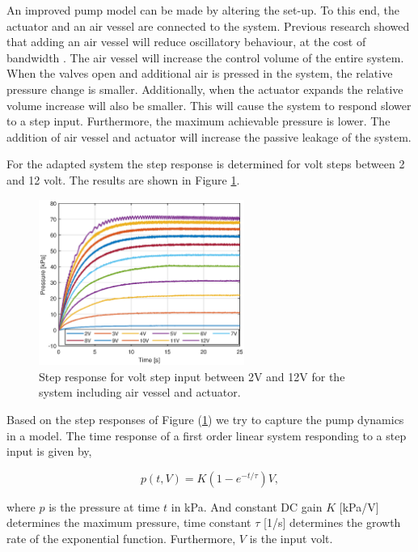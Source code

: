 An improved pump model can be made by altering the set-up. To this end, the actuator and an air vessel are connected to the system. Previous research showed that adding an air vessel will reduce oscillatory behaviour, at the cost of bandwidth \cite{proper}. The air vessel will increase the control volume of the entire system. When the valves open and additional air is pressed in the system, the relative pressure change is smaller. Additionally, when the actuator expands the relative volume increase will also be smaller. This will cause the system to respond slower to a step input. Furthermore, the maximum achievable pressure is lower. The addition of air vessel and actuator will increase the passive leakage of the system.

For the adapted system the step response is determined for volt steps between 2 and 12 volt. The results are shown in Figure \ref{fig3:pump_dynamics_adapted}.

\begin{figure}[H]
    \centering
    \includegraphics[width = 0.6\textwidth]{Figures/Chapter3/step212V.eps}
    \caption{Step response for volt step input between 2V and 12V for the system including air vessel and actuator.}
    \label{fig3:pump_dynamics_adapted}
\end{figure}


Based on the step responses of Figure (\ref{fig3:pump_dynamics_adapted}) we try to capture the pump dynamics in a model. The time response of a first order linear system responding to a step input is given by, 

\begin{equation}
    p(t,V) = K(1-e^{-t/\tau})V,
    \label{eq3:firstordermodel}
\end{equation}

where $p$ is the pressure at time $t$ in kPa. And constant DC gain $K$ [kPa/V] determines the maximum pressure, time constant $\tau$ [1/s] determines the growth rate of the exponential function. Furthermore, $V$ is the input volt. 

